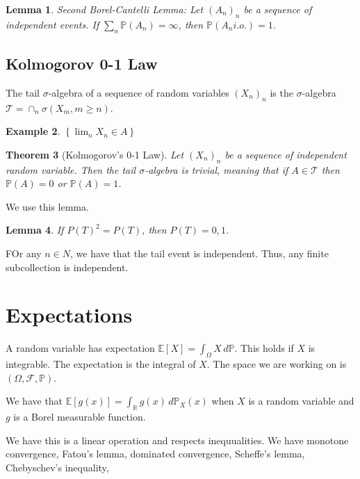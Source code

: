 \documentclass{article}
\newtheorem{theorem}{Theorem}
\newtheorem{lemma}[theorem]{Lemma}
\theoremstyle{definition}
\newtheorem{example}[theorem]{Example}
\numberwithin{theorem}{section}
\numberwithin{equation}{section}
\begin{document}
\begin{lemma}
	Second Borel-Cantelli Lemma:
	Let $(A_n)_n$ be a sequence of independent events. If $\sum_n \mathbb{P}(A_n) = \infty$, then $\mathbb{P}(A_n i.o.) = 1$. 
\end{lemma}
\subsection{Kolmogorov 0-1 Law}
The tail $\sigma$-algebra of a sequence of random variables $(X_n)_n$ is the $\sigma$-algebra $\mathcal{T}= \cap_n \sigma(X_m, m \geq n)$. 
\begin{example}
	$\left\{ \lim_n X_n \in A\right\}$
\end{example}

\begin{theorem}[Kolmogorov's 0-1 Law]
	Let $(X_n)_n$ be a sequence of independent random variable. Then the tail $\sigma$-algebra is trivial, meaning that if $A \in \mathcal{T}$ then $\mathbb{P}(A) = 0$ or $\mathbb{P}(A) = 1$. 
\end{theorem}
We use this lemma.
\begin{lemma}
	If $P(T)^2 = P(T)$, then $P(T) = 0, 1$. 
\end{lemma}
FOr any $n \in N$, we have that the tail event is independent. Thus, any finite subcollection is independent.

\section{Expectations}
A random variable has expectation $\mathbb{E}[X] = \int_\Omega X \, d\mathbb{P}$. This holds if $X$ is integrable. The expectation is the integral of $X$. The space we are working on is $(\Omega, \mathcal{F}, \mathbb{P})$. 

We have that $\mathbb{E}[g(x)] = \int_\mathbb{R} g(x) \, d \mathbb{P}_X(x)$ when $X$ is a random variable and $g$ is a Borel measurable function.

We have this is a linear operation and respects inequualities. We have monotone convergence, Fatou's lemma, dominated convergence, Scheffe's lemma, Chebyschev's inequality, 
\end{document}
